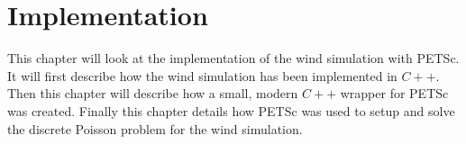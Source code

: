 \chapter{Implementation}

This chapter will look at the implementation of the wind simulation with PETSc. 
It will first describe how the wind simulation has been implemented in $C++$. Then 
this chapter will describe how a small, modern $C++$ wrapper for PETSc was created.
Finally this chapter details how PETSc was used to setup and solve the discrete 
Poisson problem for the wind simulation. 






